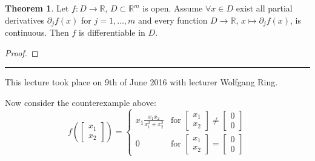 \documentclass[a4paper,landscape,twocolumn]{article}
\theoremstyle{definition}
\newtheorem{theorem}{Theorem}
\newcommand\meta[3]{\hrule{} This #1 took place on #2 with lecturer #3.\par}
\begin{document}
\begin{theorem}
  Let $f: D \to \mathbb R$, $D \subset \mathbb R^m$ is open.
  Assume $\forall x \in D$ exist all partial derivatives
  $\partial_j f(x)$ for $j = 1, \ldots, m$ and every function $D \to \mathbb R$,
  $x \mapsto \partial_j f(x)$, is continuous.
  Then $f$ is differentiable in $D$.
\end{theorem}
\begin{proof}
\end{proof}

\meta{lecture}{9th of June 2016}{Wolfgang Ring}

Now consider the counterexample above:
\[
  f(\begin{bmatrix} x_1 \\ x_2 \end{bmatrix}) = \begin{cases}
    x_1 \frac{x_1 x_2}{x_1^2 + x_2^2}  & \text{for } \begin{bmatrix} x_1 \\ x_2 \end{bmatrix} \neq \begin{bmatrix} 0 \\ 0 \end{bmatrix} \\
    0                                & \text{for } \begin{bmatrix} x_1 \\ x_2 \end{bmatrix} = \begin{bmatrix} 0 \\ 0 \end{bmatrix}
  \end{cases}
\]
\end{document}
